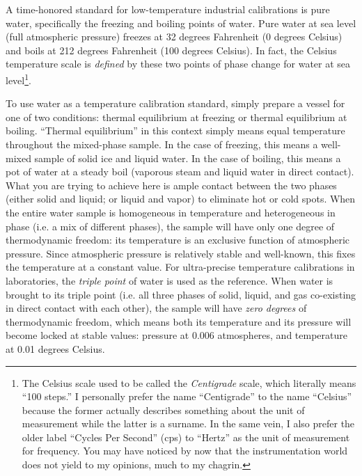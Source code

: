 \vskip 10pt

A time-honored standard for low-temperature industrial calibrations is pure water, specifically the freezing and boiling points of water.  Pure water at sea level (full atmospheric pressure) freezes at 32 degrees Fahrenheit (0 degrees Celsius) and boils at 212 degrees Fahrenheit (100 degrees Celsius).  In fact, the Celsius temperature scale is \textit{defined} by these two points of phase change for water at sea level\footnote{The Celsius scale used to be called the \textit{Centigrade} scale, which literally means ``100 steps.''  I personally prefer the name ``Centigrade'' to the name ``Celsius'' because the former actually describes something about the unit of measurement while the latter is a surname.  In the same vein, I also prefer the older label ``Cycles Per Second'' (cps) to ``Hertz'' as the unit of measurement for frequency.  You may have noticed by now that the instrumentation world does not yield to my opinions, much to my chagrin.}.         

To use water as a temperature calibration standard, simply prepare a vessel for one of two conditions: thermal equilibrium at freezing or thermal equilibrium at boiling. ``Thermal equilibrium'' in this context simply means equal temperature throughout the mixed-phase sample.  In the case of freezing, this means a well-mixed sample of solid ice and liquid water.  In the case of boiling, this means a pot of water at a steady boil (vaporous steam and liquid water in direct contact).  What you are trying to achieve here is ample contact between the two phases (either solid and liquid; or liquid and vapor) to eliminate hot or cold spots.  When the entire water sample is homogeneous in temperature and heterogeneous in phase (i.e. a mix of different phases), the sample will have only one degree of thermodynamic freedom: its temperature is an exclusive function of atmospheric pressure.  Since atmospheric pressure is relatively stable and well-known, this fixes the temperature at a constant value.  For ultra-precise temperature calibrations in laboratories, the \textit{triple point} of water is used as the reference.  When water is brought to its triple point (i.e. all three phases of solid, liquid, and gas co-existing in direct contact with each other), the sample will have \textit{zero degrees} of thermodynamic freedom, which means both its temperature and its pressure will become locked at stable values: pressure at 0.006 atmospheres, and temperature at 0.01 degrees Celsius.  

